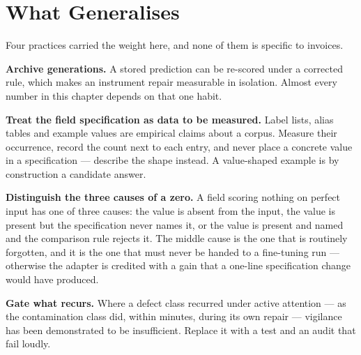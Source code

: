 \section{What Generalises}
\label{sec:validity-generalises}

Four practices carried the weight here, and none of them is specific to invoices.

\textbf{Archive generations.} A stored prediction can be re-scored under a corrected rule, which
makes an instrument repair measurable in isolation. Almost every number in this chapter depends
on that one habit.

\textbf{Treat the field specification as data to be measured.} Label lists, alias tables and
example values are empirical claims about a corpus. Measure their occurrence, record the count
next to each entry, and never place a concrete value in a specification --- describe the shape
instead. A value-shaped example is by construction a candidate answer.

\textbf{Distinguish the three causes of a zero.} A field scoring nothing on perfect input has
one of three causes: the value is absent from the input, the value is present but the
specification never names it, or the value is present and named and the comparison rule rejects
it. The middle cause is the one that is routinely forgotten, and it is the one that must never
be handed to a fine-tuning run --- otherwise the adapter is credited with a gain that a one-line
specification change would have produced.

\textbf{Gate what recurs.} Where a defect class recurred under active attention --- as the
contamination class did, within minutes, during its own repair --- vigilance has been
demonstrated to be insufficient. Replace it with a test and an audit that fail loudly.
